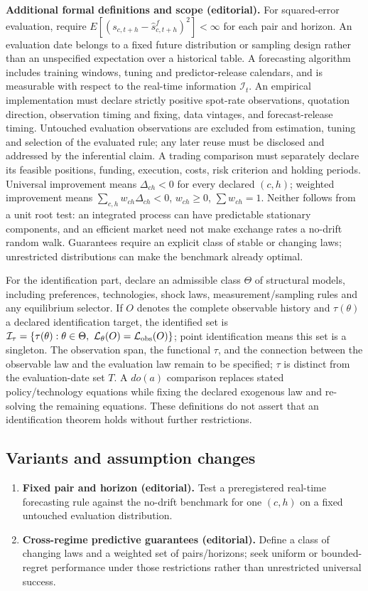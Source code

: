 \documentclass[11pt,a4paper]{article}
\begin{document}
\textbf{Additional formal definitions and scope (editorial).} For squared-error evaluation, require \(E[(s_{c,t+h}-\widehat s^f_{c,t+h})^2]<\infty\) for each pair and horizon. An evaluation date belongs to a fixed future distribution or sampling design rather than an unspecified expectation over a historical table. A forecasting algorithm includes training windows, tuning and predictor-release calendars, and is measurable with respect to the real-time information \(\mathcal I_t\). An empirical implementation must declare strictly positive spot-rate observations, quotation direction, observation timing and fixing, data vintages, and forecast-release timing. Untouched evaluation observations are excluded from estimation, tuning and selection of the evaluated rule; any later reuse must be disclosed and addressed by the inferential claim. A trading comparison must separately declare its feasible positions, funding, execution, costs, risk criterion and holding periods. Universal improvement means \(\Delta_{ch}<0\) for every declared \((c,h)\); weighted improvement means \(\sum_{c,h}w_{ch}\Delta_{ch}<0\), \(w_{ch}\geq0\), \(\sum w_{ch}=1\). Neither follows from a unit root test: an integrated process can have predictable stationary components, and an efficient market need not make exchange rates a no-drift random walk. Guarantees require an explicit class of stable or changing laws; unrestricted distributions can make the benchmark already optimal.

For the identification part, declare an admissible class \(\Theta\) of structural models, including preferences, technologies, shock laws, measurement/sampling rules and any equilibrium selector. If \(O\) denotes the complete observable history and \(\tau(\theta)\) a declared identification target, the identified set is \(\mathcal I_\tau=\{\tau(\theta):\theta\in\Theta,\ \mathcal L_\theta(O)=\mathcal L_{\rm obs}(O)\}\); point identification means this set is a singleton. The observation span, the functional \(\tau\), and the connection between the observable law and the evaluation law remain to be specified; \(\tau\) is distinct from the evaluation-date set \(T\). A \(do(a)\) comparison replaces stated policy/technology equations while fixing the declared exogenous law and re-solving the remaining equations. These definitions do not assert that an identification theorem holds without further restrictions.
\subsection*{Variants and assumption changes}
\begin{enumerate}
\item \textbf{Fixed pair and horizon (editorial).} Test a preregistered real-time forecasting rule against the no-drift benchmark for one \((c,h)\) on a fixed untouched evaluation distribution.
\item \textbf{Cross-regime predictive guarantees (editorial).} Define a class of changing laws and a weighted set of pairs/horizons; seek uniform or bounded-regret performance under those restrictions rather than unrestricted universal success.
\end{enumerate}
\end{document}

